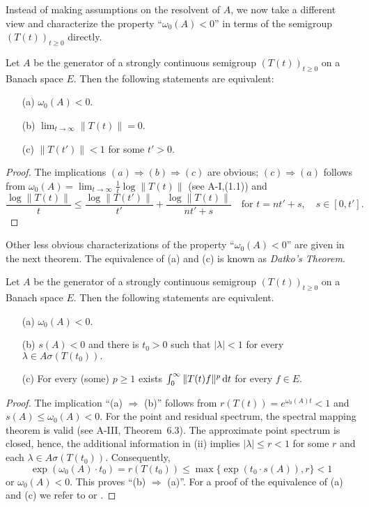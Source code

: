 Instead of making assumptions on the resolvent of $ A $, we now take a different view and characterize the property \enquote{$ \omega_0(A) < 0 $} in terms of the semigroup $ (T(t))_{t \geq 0} $ directly.
\begin{proposition} \label{prop:a4-1.10} Let $ A $ be the generator of a strongly continuous semigroup $ (T(t))_{t \geq 0} $ on a Banach space $E$. 
Then the following statements are equivalent:
\begin{itemize}
\item[(a)] $ \omega_0(A) < 0 $.
\item[(b)] $ \lim_{t \to \infty} \| T(t) \| = 0 $.
\item[(c)] $ \| T(t') \| < 1 $ for some $ t' > 0 $.
\end{itemize}
\end{proposition}

\begin{proof}
The implications $(a)  \Rightarrow  (b)  \Rightarrow  (c) $ are obvious; $(c)  \Rightarrow  (a) $ follows from  $\omega_0(A) = \lim_{t \to \infty} \frac{1}{t} \log \| T(t) \|$ (see A-I,(1.1)) and  
\[
\displaystyle
\frac{\log \|T(t)\|}{t} \leq \frac{\log \|T(t')\|}{t'} + \frac{\log \|T(t)\|}{nt' + s} \quad \text{for } t = nt' + s, \quad s \in [0,t'].
\]
\end{proof}

 Other less obvious characterizations of the property ``$ \omega_0(A) < 0 $'' are given in the next theorem. 
The equivalence of (a) and (c) is known as \emph{Datko’s Theorem}.


\begin{theorem} \label{thm:a4-1.11} Let $ A $ be the generator of a strongly continuous semigroup $ (T(t))_{t \geq 0} $ on a Banach space $ E $. 
Then the following statements are equivalent.
\begin{itemize}
\item[(a)] $ \omega_0(A) < 0 $.
\item[(b)] $ s(A) < 0 $ and there is $ t_0 > 0 $ such that  
$
|\lambda| < 1$ for every $ \lambda \in A\sigma (T(t_0)).$
\item[(c)] For every (some) $ p \geq 1 $ exists $ \int_{0}^{\infty} \| T(t) f \|^p\mathop{}\!\mathrm{d}{t} $ for every $ f \in E $.
\end{itemize}
\end{theorem}

\begin{proof} The implication ``(a) $ \Rightarrow $ (b)'' follows from $ r(T(t)) = e^{\omega_0(A) t} < 1 $ and $ s(A) \leq \omega_0(A) < 0 $. For the point and residual spectrum, the spectral mapping theorem is valid (see A-III, Theorem~6.3). The approximate point spectrum is closed, hence, the additional information in (ii)
implies $ |\lambda| \leq r < 1 $ for some $ r $ and each $ \lambda \in A\sigma(T(t_0)) $. 
Consequently, 
\[
\exp(\omega_0(A) \cdot t_0) = r(T(t_0)) \leq \max\{\exp(t_0 \cdot s(A)), r\} < 1
\]
or $ \omega_0(A) < 0 $. 
This proves \textquotedblleft (b) $\Rightarrow$ (a)\textquotedblright. 
For a proof of the equivalence of (a) and (c) we refer to \citet{datko:1972} or \citet[Theorem~4.4.1]{pazy:1983}. 
\end{proof}

